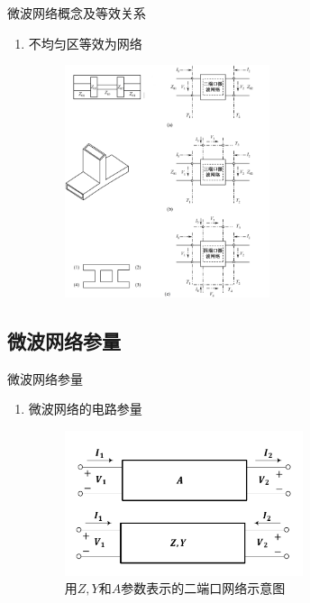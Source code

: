 \begin{frame}{微波网络概念及等效关系}
    \begin{enumerate}
        \resume
        \item 不均匀区等效为网络
              \begin{figure}
                  \includegraphics[width=6cm]{Cha5//fig5-4.png}
              \end{figure}
    \end{enumerate}
\end{frame}

\subsection{微波网络参量}
\begin{frame}{微波网络参量}
    \begin{enumerate}
        \item 微波网络的电路参量\\
              \begin{figure}
                  \includegraphics[width=7cm]{Cha5//fig5-5.pdf}
                  \caption{用$Z,Y和A$参数表示的二端口网络示意图}
              \end{figure}
    \end{enumerate}
\end{frame}

